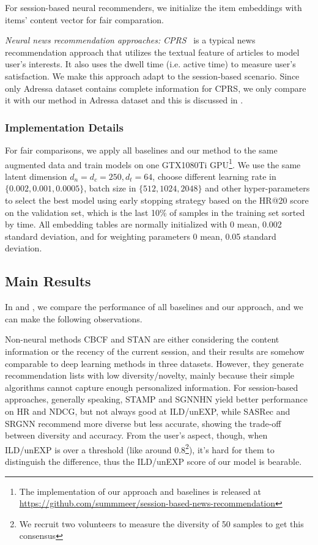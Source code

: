   For session-based neural recommenders, we initialize the item embeddings with items' content vector for fair comparation.

\textit{Neural news recommendation approaches:}
\textit{CPRS}~\cite{wu2020CPRS} is a typical news recommendation approach that utilizes the textual feature of articles to model user's interests. It also uses the dwell time (i.e. active time) to measure user's satisfaction. We make this approach adapt to the session-based scenario. Since only Adressa dataset contains complete information for CPRS, we only compare it with our method in Adressa dataset and this is discussed in .

\subsubsection{Implementation Details}
For fair comparisons, we apply all baselines and our method to the same augmented data and train 
models on one GTX1080Ti GPU\footnote{The implementation of our approach and baselines is released at \href{https://github.com/summmeer/session-based-news-recommendation}{https://github.com/summmeer/session-based-news-recommendation}}.
We use the same latent dimension $d_n=d_c=250, d_t=64$, choose different learning rate in $\{0.002, 0.001, 0.0005\}$, batch size in $\{512, 1024, 2048\}$ and other hyper-parameters to select the best model using early stopping strategy based on the HR@20 score on the validation set, which is the last 10\% of samples in the training set sorted by time. All embedding tables are normally initialized with 0 mean, 0.002 standard deviation, and for weighting parameters 0 mean, 0.05 standard deviation.

\subsection{Main Results}
\label{sec:mainres}

In  and , we compare the performance of all baselines and our
approach, and we can make the following observations.

Non-neural methods CBCF and STAN are either considering the content 
information or the recency of the current session, and their results are somehow 
comparable to deep learning methods in three datasets. However, they generate recommendation lists with low diversity/novelty, mainly because their simple algorithms cannot capture enough personalized information. For session-based approaches, generally speaking, STAMP and SGNNHN yield better performance on HR and NDCG, but not always good at ILD/unEXP, while SASRec and SRGNN recommend more diverse but less accurate, showing the trade-off between diversity and accuracy. From the user's aspect, though, when ILD/unEXP is over a threshold (like around 0.8\footnote{We recruit two volunteers to measure the diversity of 50 samples to get this consensus}), it's hard for them to distinguish the difference, thus the ILD/unEXP score of our model is bearable. 

